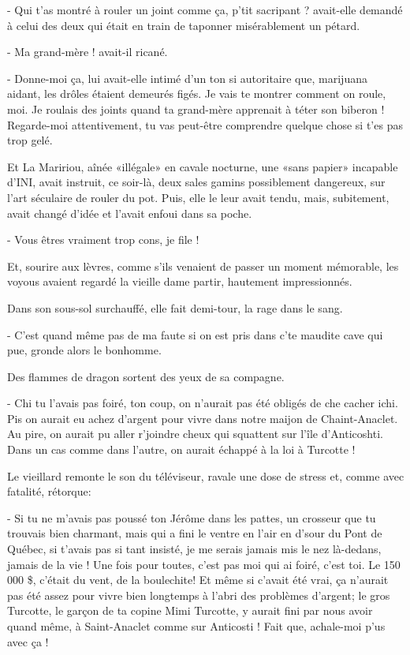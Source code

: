- Qui t’as montré à rouler un joint comme ça, p’tit sacripant ? avait-elle demandé à celui des deux qui était en train de taponner misérablement un pétard.

- Ma grand-mère ! avait-il ricané.

- Donne-moi ça, lui avait-elle intimé d’un ton si autoritaire que, marijuana aidant, les drôles étaient demeurés figés. Je vais te montrer comment on roule, moi. Je roulais des joints quand ta grand-mère apprenait à téter son biberon ! Regarde-moi attentivement, tu vas peut-être comprendre quelque chose si t’es pas trop gelé.

Et La Maririou, aînée «illégale» en cavale nocturne, une «sans papier» incapable d’INI, avait instruit, ce soir-là, deux sales gamins possiblement dangereux, sur l’art séculaire de rouler du pot. Puis, elle le leur avait tendu, mais, subitement, avait changé d’idée et l’avait enfoui dans sa poche.

- Vous êtres vraiment trop cons, je file !

Et, sourire aux lèvres, comme s’ils venaient de passer un moment mémorable, les voyous avaient regardé la vieille dame partir, hautement impressionnés.

Dans son sous-sol surchauffé, elle fait demi-tour, la rage dans le sang.

- C’est quand même pas de ma faute si on est pris dans c’te maudite cave qui pue, gronde alors le bonhomme.

Des flammes de dragon sortent des yeux de sa compagne.

- Chi tu l’avais pas foiré, ton coup, on n’aurait pas été obligés de che cacher ichi. Pis on aurait eu achez d’argent pour vivre dans notre maijon de Chaint-Anaclet. Au pire, on aurait pu aller r’joindre cheux qui squattent sur l’île d’Anticoshti. Dans un cas comme dans l’autre, on aurait échappé à la loi à Turcotte !

Le vieillard remonte le son du téléviseur, ravale une dose de stress et, comme avec fatalité, rétorque:

- Si tu ne m’avais pas poussé ton Jérôme dans les pattes, un crosseur que tu trouvais bien charmant, mais qui a fini le ventre en l’air en d’sour du Pont de Québec, si t’avais pas si tant insisté, je me serais jamais mis le nez là-dedans, jamais de la vie ! Une fois pour toutes, c’est pas moi qui ai foiré, c’est toi. Le 150 000 \$, c’était du vent, de la boulechite! Et même si c’avait été vrai, ça n’aurait pas été assez pour vivre bien longtemps à l’abri des problèmes d’argent; le gros Turcotte, le garçon de ta copine Mimi Turcotte, y aurait fini par nous avoir quand même, à Saint-Anaclet comme sur Anticosti ! Fait que, achale-moi p’us avec ça !

